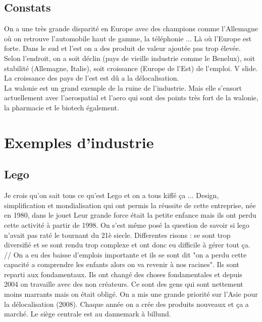 \subsection{Constats}
On a une très grande disparité en Europe avec des champions comme l’Allemagne où on retrouve l’automobile haut de gamme, la téléphonie ... Là où l’Europe est forte. Dans le sud et l’est on a des produit de valeur ajoutée pas trop élevée.\\
Selon l’endroit, on a soit déclin (pays de vieille industrie comme le Benelux), soit stabilité (Allemagne, Italie), soit croissance (Europe de l'Est) de l'emploi. V slide. La croissance des pays de l’est est dû a la délocalisation. \\
La walonie est un grand exemple de la ruine de l’industrie. Mais elle s'ensort actuellement avec l’aerospatial et l'aero qui sont des points très fort de la walonie, la pharmacie et le biotech également.

\section{Exemples d'industrie}
\subsection{Lego}
Je crois qu'on sait tous ce qu'est Lego et on a tous kiffé ça ... Design, simplification et mondialisation qui ont permis la réussite de cette entreprise, née en 1980, dans le jouet Leur grande force était la petite enfance mais ils ont perdu cette activité à partir de 1998. On s’est même posé la question de savoir si lego n'avait pas raté le tournant du 21è siecle. Differentes risons : se sont trop diversifié et se sont rendu trop complexe et ont donc eu difficile à gérer tout ça. //
On a eu des baisse d’emplois importante et ils se sont dit "on a perdu cette capacité a comprendre les enfants alors on va revenir à nos racines". Ils sont reparti aux fondamentaux. Ils ont changé des choses fondamentales et depuis 2004 on travaille avec des non créateurs. Ce sont des gens qui sont nettement moins marrants mais on était obligé.
On a mis une grande priorité sur l'Asie pour la délocalisation (2008). Chaque année on a crée des produits nouveaux et ça a marché. Le siège centrale est au dannemark à billund. 

